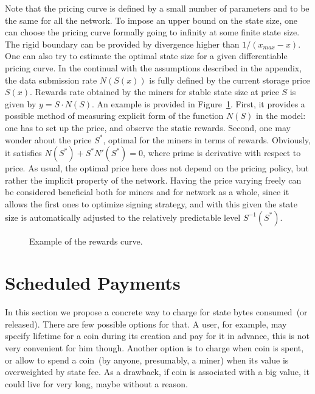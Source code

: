 \documentclass[]{llncs}   %
\newcommand{\authnote}[2]{\marginpar{\parbox{\marginparwidth}{\tiny %
  \textsf{#1 {\textcolor{blue}{notes: #2}}}}}%
  \textcolor{blue}{\textbf{\dag}}}
\newcommand{\authnote}[2]{
  \textsf{#1\textcolor{blue}{ #2}}}
\newcommand{\authnote}[2]{}
\newcommand{\knote}[1]{{\authnote{\textcolor{green}{Alex notes:}}{#1}}}
\begin{document}
Note that the pricing curve is defined by a small number of parameters and
to be the same for all the network. To impose an upper bound on the state
size, one can choose the pricing curve formally going to infinity at some finite
state size. The rigid boundary can be provided by divergence higher than
$1/(x_{max}-x)$. One can also try to estimate the optimal state size for a given
differentiable pricing curve. In the continual with the assumptions
described in the appendix, the data submission rate $N(S(x))$ is fully defined by the
current storage price $S(x)$.  Rewards rate obtained by the miners for stable
state size at price $S$ is given by $y = S \cdot N(S)$. An example is provided in
Figure~\ref{fig:rewards}. First, it provides a possible method of measuring
explicit form of the function $N(S)$ in the model: one has to set up the price,
and observe the static rewards. Second, one may wonder about the price $S^*$,
optimal for the miners in terms of rewards. Obviously, it satisfies
$N(S^*)+S^*N'(S^*)=0$, where prime is derivative with respect to price. As
usual, the optimal price here does not depend on the pricing policy, but rather
the implicit property of the network. \knote{what does the last sentence mean?}  Having the price varying freely can be
considered beneficial both for miners and for network as a whole, since it
allows the first ones to optimize signing strategy, and with this given the
state size is automatically adjusted to the relatively predictable level
$S^{-1}(S^*)$.

\begin{figure}
    
    \caption{
        \label{fig:rewards} Example of the rewards curve.
    }
\end{figure}

\section{Scheduled Payments}
\label{sec:scheduled}

In this section we propose a concrete way to charge for state bytes consumed~(or released). There are few possible options for that. A user, for example, may specify lifetime for a coin during its creation and pay for it in advance, this is not very convenient for him though. Another option is to charge when coin is spent, or allow to spend a coin~(by anyone, presumably, a miner) when its value is overweighted by state fee. As a drawback, if coin is associated with a big value, it could live for very long, maybe without a reason. 
\end{document}
